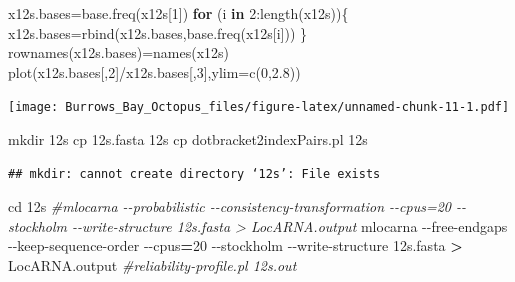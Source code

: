 \documentclass[
]{article}
\newenvironment{Shaded}{\begin{snugshade}}{\end{snugshade}}
\newcommand{\AttributeTok}[1]{\textcolor[rgb]{0.77,0.63,0.00}{#1}}
\newcommand{\BuiltInTok}[1]{#1}
\newcommand{\CommentTok}[1]{\textcolor[rgb]{0.56,0.35,0.01}{\textit{#1}}}
\newcommand{\ControlFlowTok}[1]{\textcolor[rgb]{0.13,0.29,0.53}{\textbf{#1}}}
\newcommand{\DecValTok}[1]{\textcolor[rgb]{0.00,0.00,0.81}{#1}}
\newcommand{\ExtensionTok}[1]{#1}
\newcommand{\FloatTok}[1]{\textcolor[rgb]{0.00,0.00,0.81}{#1}}
\newcommand{\FunctionTok}[1]{\textcolor[rgb]{0.00,0.00,0.00}{#1}}
\newcommand{\NormalTok}[1]{#1}
\newcommand{\OperatorTok}[1]{\textcolor[rgb]{0.81,0.36,0.00}{\textbf{#1}}}
\newcommand{\OtherTok}[1]{\textcolor[rgb]{0.56,0.35,0.01}{#1}}
\newcommand{\SpecialCharTok}[1]{\textcolor[rgb]{0.00,0.00,0.00}{#1}}
\newcommand{\StringTok}[1]{\textcolor[rgb]{0.31,0.60,0.02}{#1}}
\begin{document}
\begin{Shaded}
\begin{Highlighting}[]
\NormalTok{x12s.bases}\OtherTok{=}\FunctionTok{base.freq}\NormalTok{(x12s[}\DecValTok{1}\NormalTok{])}
\ControlFlowTok{for}\NormalTok{ (i }\ControlFlowTok{in} \DecValTok{2}\SpecialCharTok{:}\FunctionTok{length}\NormalTok{(x12s))\{}
\NormalTok{  x12s.bases}\OtherTok{=}\FunctionTok{rbind}\NormalTok{(x12s.bases,}\FunctionTok{base.freq}\NormalTok{(x12s[i]))  }
\NormalTok{\}}
\FunctionTok{rownames}\NormalTok{(x12s.bases)}\OtherTok{=}\FunctionTok{names}\NormalTok{(x12s)}
\FunctionTok{plot}\NormalTok{(x12s.bases[,}\DecValTok{2}\NormalTok{]}\SpecialCharTok{/}\NormalTok{x12s.bases[,}\DecValTok{3}\NormalTok{],}\AttributeTok{ylim=}\FunctionTok{c}\NormalTok{(}\DecValTok{0}\NormalTok{,}\FloatTok{2.8}\NormalTok{))}
\end{Highlighting}
\end{Shaded}

\texttt{[image: Burrows\_Bay\_Octopus\_files/figure-latex/unnamed-chunk-11-1.pdf]}

\begin{Shaded}
\end{Shaded}

\begin{Shaded}
\begin{Highlighting}[]
\FunctionTok{mkdir}\NormalTok{ 12s}
\FunctionTok{cp}\NormalTok{ 12s.fasta 12s}
\FunctionTok{cp}\NormalTok{ dotbracket2indexPairs.pl 12s}
\end{Highlighting}
\end{Shaded}

\begin{verbatim}
## mkdir: cannot create directory ‘12s’: File exists
\end{verbatim}

\begin{Shaded}
\begin{Highlighting}[]
\BuiltInTok{cd}\NormalTok{ 12s}
\CommentTok{\#mlocarna {-}{-}probabilistic {-}{-}consistency{-}transformation {-}{-}cpus=20 {-}{-}stockholm {-}{-}write{-}structure 12s.fasta \textgreater{} LocARNA.output}
\ExtensionTok{mlocarna} \AttributeTok{{-}{-}free{-}endgaps} \AttributeTok{{-}{-}keep{-}sequence{-}order} \AttributeTok{{-}{-}cpus}\OperatorTok{=}\NormalTok{20 }\AttributeTok{{-}{-}stockholm} \AttributeTok{{-}{-}write{-}structure}\NormalTok{ 12s.fasta }\OperatorTok{\textgreater{}}\NormalTok{ LocARNA.output}
\CommentTok{\#reliability{-}profile.pl 12s.out}
\end{Highlighting}
\end{Shaded}
\end{document}
